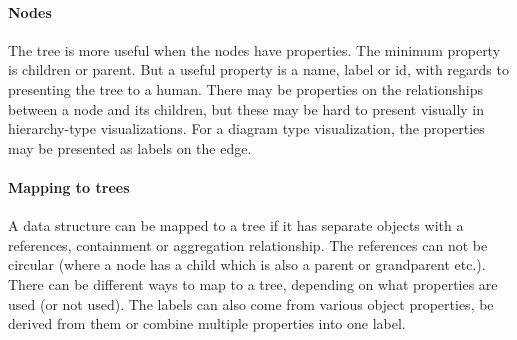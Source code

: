 \paragraph{Nodes}
The tree is more useful when the nodes have properties.
The minimum property is children or parent.
But a useful property is a name, label or id, with regards to presenting the tree to a human.
There may be properties on the relationships between a node and its children, but these may be hard to present visually in hierarchy-type visualizations.
For a diagram type visualization, the properties may be presented as labels on the edge.

\paragraph{Mapping to trees}
A data structure can be mapped to a tree if it has separate objects with a references, containment or aggregation relationship.
The references can not be circular (where a node has a child which is also a parent or grandparent etc.).
There can be different ways to map to a tree, depending on what properties are used (or not used).
The labels can also come from various object properties, be derived from them or combine multiple properties into one label.
